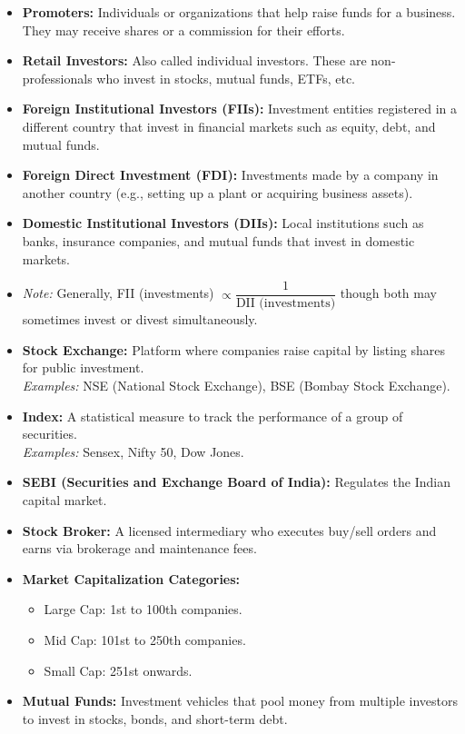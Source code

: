 \documentclass[12pt]{article}
\begin{document}
\begin{itemize}
    \item \textbf{Promoters:} Individuals or organizations that help raise funds for a business. They may receive shares or a commission for their efforts.
    
    \item \textbf{Retail Investors:} Also called individual investors. These are non-professionals who invest in stocks, mutual funds, ETFs, etc.
    
    \item \textbf{Foreign Institutional Investors (FIIs):} Investment entities registered in a different country that invest in financial markets such as equity, debt, and mutual funds.

    \item \textbf{Foreign Direct Investment (FDI):} Investments made by a company in another country (e.g., setting up a plant or acquiring business assets).

    \item \textbf{Domestic Institutional Investors (DIIs):} Local institutions such as banks, insurance companies, and mutual funds that invest in domestic markets.

    \item \textit{Note:} Generally, FII (investments) $\propto \dfrac{1}{\text{DII (investments)}}$ though both may sometimes invest or divest simultaneously.

    \item \textbf{Stock Exchange:} Platform where companies raise capital by listing shares for public investment. \\
    \textit{Examples:} NSE (National Stock Exchange), BSE (Bombay Stock Exchange).

    \item \textbf{Index:} A statistical measure to track the performance of a group of securities. \\
    \textit{Examples:} Sensex, Nifty 50, Dow Jones.

    \item \textbf{SEBI (Securities and Exchange Board of India):} Regulates the Indian capital market.

    \item \textbf{Stock Broker:} A licensed intermediary who executes buy/sell orders and earns via brokerage and maintenance fees.

    \item \textbf{Market Capitalization Categories:}
    \begin{itemize}
        \item Large Cap: 1st to 100th companies.
        \item Mid Cap: 101st to 250th companies.
        \item Small Cap: 251st onwards.
    \end{itemize}

    \item \textbf{Mutual Funds:} Investment vehicles that pool money from multiple investors to invest in stocks, bonds, and short-term debt.
\end{itemize}
\end{document}
